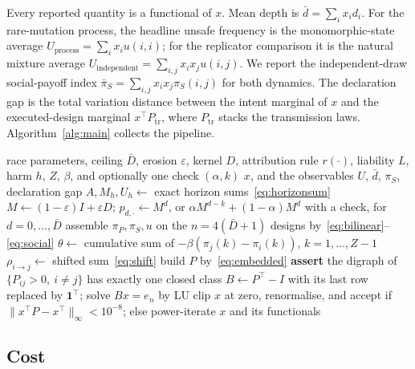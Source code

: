 \documentclass[a4paper,fleqn]{cas-sc}
\newcommand{\piP}{\pi_{P}}
\newcommand{\piS}{\pi_{S}}
\begin{document}
Every reported quantity is a functional of $x$. Mean depth is
$\bar d=\sum_i x_i d_i$. For the rare-mutation process, the headline unsafe
frequency is the monomorphic-state average
$U_{\mathrm{process}}=\sum_i x_i u(i,i)$; for the replicator comparison it is
the natural mixture average
$U_{\mathrm{independent}}=\sum_{i,j}x_i x_j u(i,j)$.
We report the independent-draw social-payoff index
$\bar\pi_S=\sum_{i,j}x_i x_j\piS(i,j)$ for both dynamics. The declaration gap is
the total variation distance between the intent marginal of $x$ and the
executed-design marginal $x^\top P_{\mathrm{tr}}$, where $P_{\mathrm{tr}}$
stacks the transmission laws. Algorithm~\ref{alg:main} collects the pipeline.

\begin{algorithm}[t]
\caption{Stationary regime of the delegation game}
\label{alg:main}
\begin{algorithmic}[1]
\Require race parameters, ceiling $\bar D$, erosion $\varepsilon$, kernel $D$,
  attribution rule $r(\cdot)$, liability $L$, harm $h$, $Z$, $\beta$, and
  optionally one check $(\alpha,k)$
\Ensure $x$, and the observables $U$, $\bar d$, $\piS$, declaration gap
\State $A, M_{h}, U_{h} \gets$ exact horizon sums~\eqref{eq:horizonsum}
\State $M \gets (1-\varepsilon)I + \varepsilon D$;\quad
  $p_{d,\cdot} \gets M^{d}$, or $\alpha M^{d-k}+(1-\alpha)M^{d}$ with a check,
  for $d=0,\dots,\bar D$
\State assemble $\piP,\piS,u$ on the $n=4(\bar D+1)$ designs
  by~\eqref{eq:bilinear}--\eqref{eq:social} 
  \State $\theta \gets$ cumulative sum of $-\beta(\pi_{j}(k)-\pi_{i}(k))$,
    $k=1,\dots,Z-1$ 
  \State $\rho_{i\to j} \gets$ shifted sum~\eqref{eq:shift}
\EndFor
\State build $P$ by~\eqref{eq:embedded}
\State \textbf{assert} the digraph of $\{P_{ij}>0,\ i\ne j\}$ has exactly one
  closed class 
\State $B \gets P^{\top}-I$ with its last row replaced by $\mathbf{1}^{\top}$;
  \quad solve $Bx=e_{n}$ by LU 
\State clip $x$ at zero, renormalise, and accept if
  $\lVert x^{\top}P-x^{\top}\rVert_{\infty}<10^{-8}$; else power-iterate
\State \Return $x$ and its functionals
\end{algorithmic}
\end{algorithm}

\subsection{Cost}
\label{sec:cost}
\end{document}
